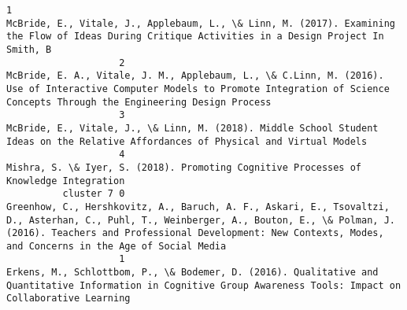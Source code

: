 \documentclass[journal,twocolumn]{IEEEtran}
\begin{document}
\begin{Verbatim}[commandchars=\\\{\}]
                    1                                                                                                                                                                                                                                                                             McBride, E., Vitale, J., Applebaum, L., \& Linn, M. (2017). Examining the Flow of Ideas During Critique Activities in a Design Project In Smith, B
                    2                                                                                                                                                                                                                                      McBride, E. A., Vitale, J. M., Applebaum, L., \& C.Linn, M. (2016). Use of Interactive Computer Models to Promote Integration of Science Concepts Through the Engineering Design Process 
                    3                                                                                                                                                                                                                                                                                            McBride, E., Vitale, J., \& Linn, M. (2018). Middle School Student Ideas on the Relative Affordances of Physical and Virtual Models
                    4                                                                                                                                                                                                                                                                                                                                          Mishra, S. \& Iyer, S. (2018). Promoting Cognitive Processes of Knowledge Integration
          cluster 7 0                                                                                                                                                                        Greenhow, C., Hershkovitz, A., Baruch, A. F., Askari, E., Tsovaltzi, D., Asterhan, C., Puhl, T., Weinberger, A., Bouton, E., \& Polman, J. (2016). Teachers and Professional Development: New Contexts, Modes, and Concerns in the Age of Social Media 
                    1                                                                                                                                                                                                                                                              Erkens, M., Schlottbom, P., \& Bodemer, D. (2016). Qualitative and Quantitative Information in Cognitive Group Awareness Tools: Impact on Collaborative Learning 

\end{Verbatim}
\end{document}
